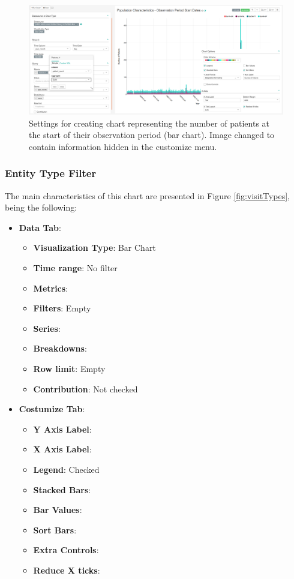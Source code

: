 \documentclass[]{book}
\providecommand{\tightlist}{%
  \setlength{\itemsep}{0pt}\setlength{\parskip}{0pt}}
\begin{document}
\begin{figure}
\includegraphics[width=1\linewidth]{images/populationCharacteristicsObservationPeriodStartDates} \caption{Settings for creating chart representing the number of patients at the start of their observation period (bar chart). Image changed to contain information hidden in the customize menu.}\label{fig:visitTypes5}
\end{figure}

\subsubsection{Entity Type Filter}\label{entity-type-filter}

The main characteristics of this chart are presented in Figure
\ref{fig:visitTypes}, being the following:

\begin{itemize}
\tightlist
\item
  \textbf{Data Tab}:

  \begin{itemize}
  \tightlist
  \item
    \textbf{Visualization Type}: Bar Chart
  \item
    \textbf{Time range}: No filter
  \item
    \textbf{Metrics}:
  \item
    \textbf{Filters}: Empty
  \item
    \textbf{Series}:
  \item
    \textbf{Breakdowns}:
  \item
    \textbf{Row limit}: Empty
  \item
    \textbf{Contribution}: Not checked
  \end{itemize}
\item
  \textbf{Costumize Tab}:

  \begin{itemize}
  \tightlist
  \item
    \textbf{Y Axis Label}:
  \item
    \textbf{X Axis Label}:
  \item
    \textbf{Legend}: Checked
  \item
    \textbf{Stacked Bars}:
  \item
    \textbf{Bar Values}:
  \item
    \textbf{Sort Bars}:
  \item
    \textbf{Extra Controls}:
  \item
    \textbf{Reduce X ticks}:
  \end{itemize}
\end{itemize}
\end{document}

